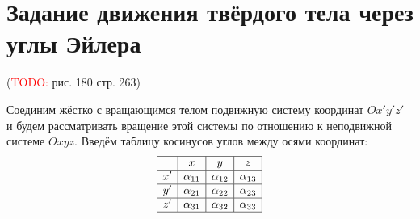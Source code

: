 \section{Задание движения твёрдого тела через углы Эйлера}

(\textcolor{red}{TODO:} рис. 180 стр. 263)

Соединим жёстко с вращающимся телом подвижную систему координат $Ox'y'z'$ и
будем рассматривать вращение этой системы по отношению к неподвижной системе
$Oxyz$. Введём таблицу косинусов углов между осями координат:
\begin{equation*}
  \begin{array}{|c|c|c|c|}
    \hline
    & x & y & z \\
    \hline
    x' & \alpha_{11} & \alpha_{12} & \alpha_{13} \\
    \hline
    y' & \alpha_{21} & \alpha_{22} & \alpha_{23} \\
    \hline
    z' & \alpha_{31} & \alpha_{32} & \alpha_{33} \\
    \hline
  \end{array}
\end{equation*}


